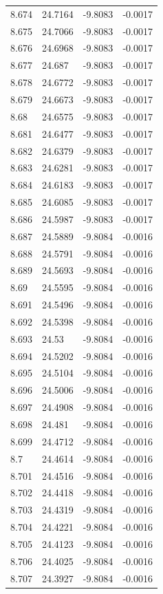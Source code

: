 \begin{tabular}{llll}
8.674 & 24.7164 & -9.8083 & -0.0017 \\
8.675 & 24.7066 & -9.8083 & -0.0017 \\
8.676 & 24.6968 & -9.8083 & -0.0017 \\
8.677 & 24.687 & -9.8083 & -0.0017 \\
8.678 & 24.6772 & -9.8083 & -0.0017 \\
8.679 & 24.6673 & -9.8083 & -0.0017 \\
8.68 & 24.6575 & -9.8083 & -0.0017 \\
8.681 & 24.6477 & -9.8083 & -0.0017 \\
8.682 & 24.6379 & -9.8083 & -0.0017 \\
8.683 & 24.6281 & -9.8083 & -0.0017 \\
8.684 & 24.6183 & -9.8083 & -0.0017 \\
8.685 & 24.6085 & -9.8083 & -0.0017 \\
8.686 & 24.5987 & -9.8083 & -0.0017 \\
8.687 & 24.5889 & -9.8084 & -0.0016 \\
8.688 & 24.5791 & -9.8084 & -0.0016 \\
8.689 & 24.5693 & -9.8084 & -0.0016 \\
8.69 & 24.5595 & -9.8084 & -0.0016 \\
8.691 & 24.5496 & -9.8084 & -0.0016 \\
8.692 & 24.5398 & -9.8084 & -0.0016 \\
8.693 & 24.53 & -9.8084 & -0.0016 \\
8.694 & 24.5202 & -9.8084 & -0.0016 \\
8.695 & 24.5104 & -9.8084 & -0.0016 \\
8.696 & 24.5006 & -9.8084 & -0.0016 \\
8.697 & 24.4908 & -9.8084 & -0.0016 \\
8.698 & 24.481 & -9.8084 & -0.0016 \\
8.699 & 24.4712 & -9.8084 & -0.0016 \\
8.7 & 24.4614 & -9.8084 & -0.0016 \\
8.701 & 24.4516 & -9.8084 & -0.0016 \\
8.702 & 24.4418 & -9.8084 & -0.0016 \\
8.703 & 24.4319 & -9.8084 & -0.0016 \\
8.704 & 24.4221 & -9.8084 & -0.0016 \\
8.705 & 24.4123 & -9.8084 & -0.0016 \\
8.706 & 24.4025 & -9.8084 & -0.0016 \\
8.707 & 24.3927 & -9.8084 & -0.0016 \\

\end{tabular}
